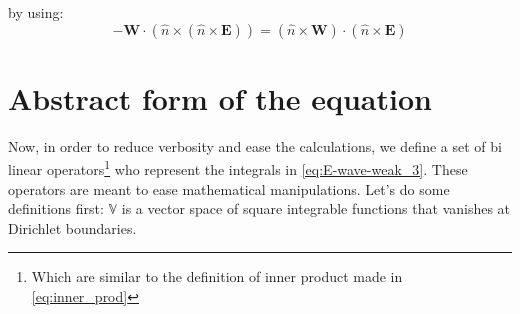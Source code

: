 by using:
$$-\mathbf{W}\cdot\left(\hat{n}\times \left( \hat{n}\times 
\mathbf{E} \right)\right)  = \left(\hat{n}\times \mathbf{W}\right)\cdot\left( \hat{n}\times 
\mathbf{E} \right) $$


\section{Abstract form of the equation}

Now, in order to reduce verbosity and ease the calculations, we define a set of bi linear operators\footnote{Which are similar to the definition of inner product made in \ref{eq:inner_prod}} who represent the integrals in \ref{eq:E-wave-weak_3}. These operators are meant to ease mathematical manipulations. Let's do some definitions first:
$\mathbb{V}$ is a vector space of square integrable functions that vanishes at Dirichlet boundaries.

